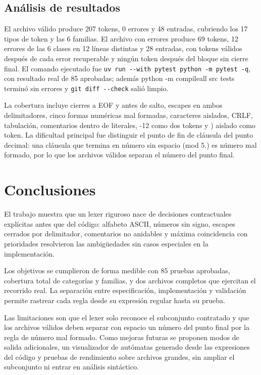 \documentclass[11pt,letterpaper]{article}
\newcommand{\code}[1]{{\ttfamily\small #1}}
\begin{document}
\subsection{Análisis de resultados}

El archivo válido produce 207 tokens, 0 errores y 48 entradas, cubriendo los 17 tipos de token y las 6 familias. El archivo con errores produce 69 tokens, 12 errores de las 6 clases en 12 líneas distintas y 28 entradas, con tokens válidos después de cada error recuperable y ningún token después del bloque sin cierre final. El comando ejecutado fue \lstinline|uv run --with pytest python -m pytest -q|, con resultado real de 85 aprobadas; además \code{python -m compileall src tests} terminó sin errores y \lstinline|git diff --check| salió limpio.

La cobertura incluye cierres a EOF y antes de salto, escapes en ambos delimitadores, cinco formas numéricas mal formadas, caracteres aislados, \code{CRLF}, tabulación, comentarios dentro de literales, \code{-12} como dos tokens y \code{)} aislado como token. La dificultad principal fue distinguir el punto de fin de cláusula del punto decimal: una cláusula que termina en número sin espacio (\code{mod 5.}) es número mal formado, por lo que los archivos válidos separan el número del punto final.

\section{Conclusiones}

El trabajo muestra que un lexer riguroso nace de decisiones contractuales explícitas antes que del código: alfabeto ASCII, números sin signo, escapes cerrados por delimitador, comentarios no anidables y máxima coincidencia con prioridades resolvieron las ambigüedades sin casos especiales en la implementación.

Los objetivos se cumplieron de forma medible con 85 pruebas aprobadas, cobertura total de categorías y familias, y dos archivos completos que ejercitan el recorrido real. La separación entre especificación, implementación y validación permite rastrear cada regla desde su expresión regular hasta su prueba.

Las limitaciones son que el lexer solo reconoce el subconjunto contratado y que los archivos válidos deben separar con espacio un número del punto final por la regla de número mal formado. Como mejoras futuras se proponen modos de salida adicionales, un visualizador de autómatas generado desde las expresiones del código y pruebas de rendimiento sobre archivos grandes, sin ampliar el subconjunto ni entrar en análisis sintáctico.
\end{document}
